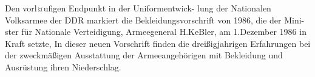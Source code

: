 

Den vorl¤ufigen Endpunkt in der Uniformentwick-
lung der Nationalen Volksarmee der DDR markiert
die Bekleidungsvorschrift von 1986, die der Mini-
ster für Nationale Verteidigung, Armeegeneral
H.KeBler, am 1.Dezember 1986 in Kraft setzte, In
dieser neuen Vorschrift finden die dreißigjahrigen
Erfahrungen bei der zweckmäßigen Ausstattung der
Armeeangehörigen mit Bekleidung und Ausrüstung
ihren Niederschlag.